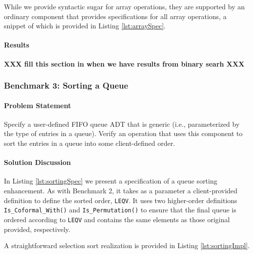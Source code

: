 While we provide syntactic sugar for array operations, they are supported by an ordinary component that provides specifications for all array operations, a snippet of which is provided in Listing \ref{lst:arraySpec}.



\paragraph{Results} \textbf{XXX fill this section in when we have results from binary searh XXX}

\FloatBarrier
		\subsubsection{Benchmark 3: Sorting a Queue}	%

\paragraph{Problem Statement}Specify a user-defined FIFO queue ADT that is generic (i.e., parameterized by the type of entries in a queue). Verify an operation that uses this component to sort the entries in a queue into some client-defined order.

\paragraph{Solution Discussion}In Listing \ref{lst:sortingSpec} we present a specification of a queue sorting enhancement.  As with Benchmark 2, it takes as a parameter a client-provided definition to define the sorted order, \texttt{LEQV}.  It uses two higher-order definitions \texttt{Is\_Coformal\_With()} and \texttt{Is\_Permutation()} to ensure that the final queue is ordered according to \texttt{LEQV} and contains the same elements as those original provided, respectively.



A straightforward selection sort realization is provided in Listing \ref{lst:sortingImpl}.

